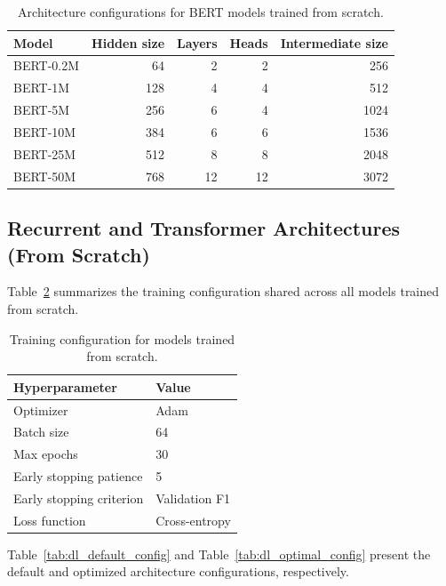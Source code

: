 \begin{table}[h]
\centering
\caption{Architecture configurations for BERT models trained from scratch.}
\label{tab:tiny_bert_config}
\begin{tabular}{lrrrr}
\toprule
Model & Hidden size & Layers & Heads & Intermediate size \\
\midrule
BERT-0.2M & 64 & 2 & 2 & 256 \\
BERT-1M & 128 & 4 & 4 & 512 \\
BERT-5M & 256 & 6 & 4 & 1024 \\
BERT-10M & 384 & 6 & 6 & 1536 \\
BERT-25M & 512 & 8 & 8 & 2048 \\
BERT-50M & 768 & 12 & 12 & 3072 \\
\bottomrule
\end{tabular}
\end{table}

\subsection{Recurrent and Transformer Architectures (From Scratch)}
\label{appendix:dl_scratch}

Table~\ref{tab:dl_training} summarizes the training configuration shared across all models trained from scratch.

\begin{table}[h]
\centering
\caption{Training configuration for models trained from scratch.}
\label{tab:dl_training}
\begin{tabular}{ll}
\toprule
Hyperparameter & Value \\
\midrule
Optimizer & Adam \\
Batch size & 64 \\
Max epochs & 30 \\
Early stopping patience & 5 \\
Early stopping criterion & Validation F1 \\
Loss function & Cross-entropy \\
\bottomrule
\end{tabular}
\end{table}

Table~\ref{tab:dl_default_config} and Table~\ref{tab:dl_optimal_config} present the default and optimized architecture configurations, respectively.

